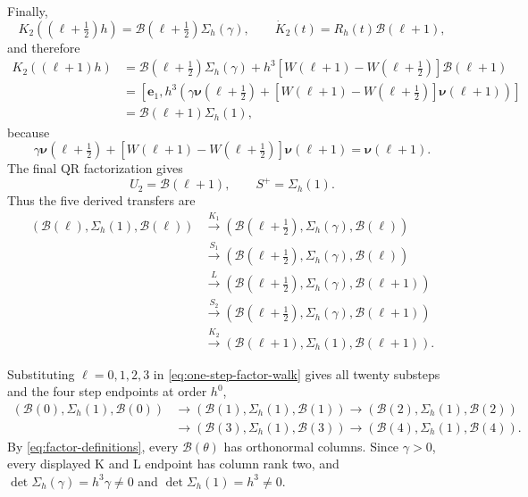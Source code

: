 \documentclass[10pt,a4paper]{amsart}
\numberwithin{equation}{section}
\begin{document}
Finally,
\[
 K_2((\ell+\tfrac12)h)=\mathcal B(\ell+\tfrac12)\Sigma_h(\gamma),
 \qquad \dot K_2(t)=R_h(t)\mathcal B(\ell+1),
\]
and therefore
\begin{align*}
 K_2((\ell+1)h)
 &=\mathcal B(\ell+\tfrac12)\Sigma_h(\gamma)+h^3
 [W(\ell+1)-W(\ell+\tfrac12)]\mathcal B(\ell+1)\\
 &=\left[\boldsymbol e_1,
 h^3\left(\gamma\boldsymbol\nu(\ell+\tfrac12)
 +[W(\ell+1)-W(\ell+\tfrac12)]\boldsymbol\nu(\ell+1)\right)\right]\\
 &=\mathcal B(\ell+1)\Sigma_h(1),
\end{align*}
because
\[
 \gamma\boldsymbol\nu(\ell+\tfrac12)+
 [W(\ell+1)-W(\ell+\tfrac12)]\boldsymbol\nu(\ell+1)
 =\boldsymbol\nu(\ell+1).
\]
The final QR factorization gives
\[
 U_2=\mathcal B(\ell+1),
 \qquad S^+=\Sigma_h(1).
\]
Thus the five derived transfers are
\begin{equation}\label{eq:one-step-factor-walk}
\begin{aligned}
 (\mathcal B(\ell),\Sigma_h(1),\mathcal B(\ell))
 &\xrightarrow{K_1}
 (\mathcal B(\ell+\tfrac12),\Sigma_h(\gamma),\mathcal B(\ell))\\
 &\xrightarrow{S_1}
 (\mathcal B(\ell+\tfrac12),\Sigma_h(\gamma),\mathcal B(\ell))\\
 &\xrightarrow{L}
 (\mathcal B(\ell+\tfrac12),\Sigma_h(\gamma),\mathcal B(\ell+1))\\
 &\xrightarrow{S_2}
 (\mathcal B(\ell+\tfrac12),\Sigma_h(\gamma),\mathcal B(\ell+1))\\
 &\xrightarrow{K_2}
 (\mathcal B(\ell+1),\Sigma_h(1),\mathcal B(\ell+1)).
\end{aligned}
\end{equation}

Substituting $\ell=0,1,2,3$ in
\eqref{eq:one-step-factor-walk} gives all twenty substeps and the four
step endpoints at order $h^0$,
\begin{equation}\label{eq:four-step-factor-chain}
\begin{aligned}
 (\mathcal B(0),\Sigma_h(1),\mathcal B(0))&\longrightarrow(\mathcal B(1),\Sigma_h(1),\mathcal B(1))
 \longrightarrow(\mathcal B(2),\Sigma_h(1),\mathcal B(2))\\
 &\longrightarrow(\mathcal B(3),\Sigma_h(1),\mathcal B(3))
 \longrightarrow(\mathcal B(4),\Sigma_h(1),\mathcal B(4)).
\end{aligned}
\end{equation}
By \eqref{eq:factor-definitions}, every $\mathcal B(\theta)$ has orthonormal columns.
Since $\gamma>0$, every displayed K and L endpoint has column rank two,
and $\det \Sigma_h(\gamma)=h^3\gamma\ne0$ and
$\det \Sigma_h(1)=h^3\ne0$.
\end{document}
